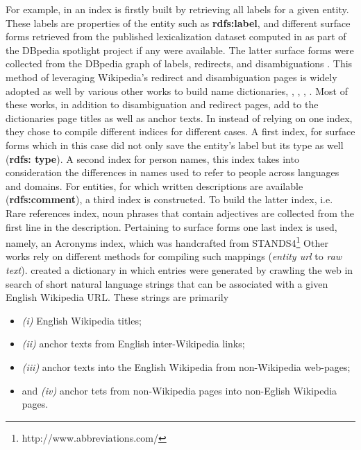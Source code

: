\indent For example, in \cite{AGDISTIS} an index is firstly built by retrieving all labels for a given entity. These labels are properties of the entity such as \textbf{rdfs:label}, and different surface forms retrieved from the published lexicalization dataset computed in \cite{Mendes2011} as part of the DBpedia spotlight project if any were available. The latter surface forms were collected from the DBpedia graph of labels, redirects, and disambiguations \cite{Mendes2011}.
This method of leveraging Wikipedia's redirect and disambiguation pages is widely adopted as well by various other works to build name dictionaries, \cite{Phan2017}, \cite{bunescu-pasca-2006-using},  \cite{zhang2010entity}, \cite{cucerzan2007large}. Most of these works, in addition to disambiguation and redirect pages, add to the dictionaries page titles as well as anchor texts.\newline
In \cite{Moussallem2017} instead of relying on one index, they chose to compile different indices for different cases. A first index, for surface forms which in this case did not only save the entity's label but its type as well (\textbf{rdfs: type}). A second index for person names, this index takes into consideration the differences in names used to refer to people across languages and domains. For entities, for which written descriptions are available (\textbf{rdfs:comment}), a third index is constructed. To build the latter index, i.e. Rare references index, noun phrases that contain adjectives are collected from the first line in the description. Pertaining to surface forms one last index is used, namely, an Acronyms index, which was handcrafted from STANDS4\footnote{http://www.abbreviations.com/}\newline
Other works rely on different methods for compiling such mappings (\textit{entity url} to \textit{raw text}). \cite{spitkovsky-chang-2012-cross} created a dictionary in which entries were generated by crawling the web in search of short natural language strings that can be associated with a given English Wikipedia URL. These strings are primarily 
\begin{itemize}
\item{\textit{(i)} English Wikipedia titles;}
\item{\textit{(ii)} anchor texts from English inter-Wikipedia links;}
\item{\textit{(iii)} anchor texts into the English Wikipedia from non-Wikipedia web-pages;}
\item{and \textit{(iv)} anchor tets from non-Wikipedia pages into non-Eglish Wikipedia pages.}\newline
\end{itemize}

